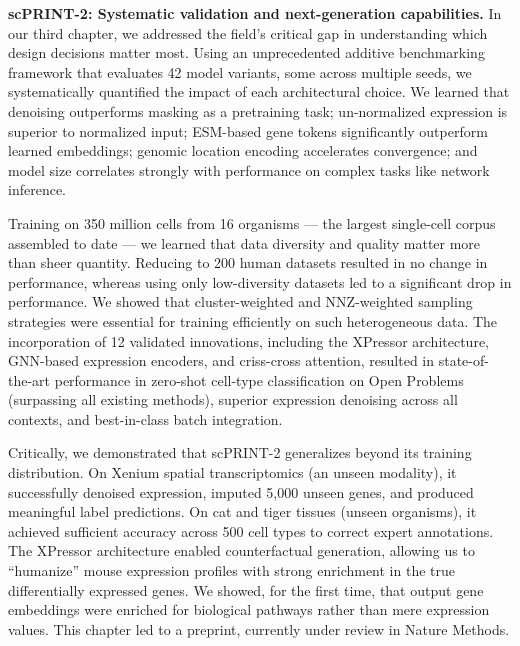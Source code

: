 \textbf{scPRINT-2: Systematic validation and next-generation capabilities.} In our third chapter, we addressed the field's critical gap in understanding which design decisions matter most. Using an unprecedented additive benchmarking framework that evaluates 42 model variants, some across multiple seeds, we systematically quantified the impact of each architectural choice. We learned that denoising outperforms masking as a pretraining task; un-normalized expression is superior to normalized input; \gls{ESM}-based gene tokens significantly outperform learned embeddings; genomic location encoding accelerates convergence; and model size correlates strongly with performance on complex tasks like network inference.

Training on 350 million cells from 16 organisms — the largest single-cell corpus assembled to date — we learned that data diversity and quality matter more than sheer quantity. Reducing to 200 human datasets resulted in no change in performance, whereas using only low-diversity datasets led to a significant drop in performance. We showed that cluster-weighted and \gls{NNZ}-weighted sampling strategies were essential for training efficiently on such heterogeneous data. The incorporation of 12 validated innovations, including the XPressor architecture, \gls{GNN}-based expression encoders, and criss-cross attention, resulted in state-of-the-art performance in zero-shot cell-type classification on Open Problems (surpassing all existing methods), superior expression denoising across all contexts, and best-in-class batch integration.

Critically, we demonstrated that \gls{scPRINT}-2 generalizes beyond its training distribution. On Xenium spatial transcriptomics (an unseen modality), it successfully denoised expression, imputed 5,000 unseen genes, and produced meaningful label predictions. On cat and tiger tissues (unseen organisms), it achieved sufficient accuracy across 500 cell types to correct expert annotations. The XPressor architecture enabled counterfactual generation, allowing us to ``humanize'' mouse expression profiles with strong enrichment in the true differentially expressed genes. We showed, for the first time, that output gene embeddings were enriched for biological pathways rather than mere expression values. This chapter led to a preprint, currently under review in Nature Methods.

